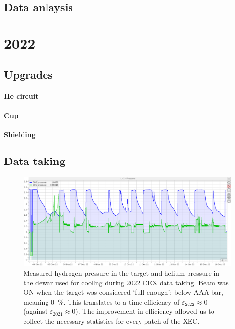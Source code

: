 \begin{refsection}
\subsection{Data anlaysis}

\section{2022}
\subsection{Upgrades}
\paragraph{He circuit}
\paragraph{Cup}
\paragraph{Shielding}
\subsection{Data taking}

\begin{figure}
    \centering
    \includegraphics[width = \textwidth]{Figures/LH2/2022CEX_LH2.png}
    \caption{Measured hydrogen pressure in the target and helium pressure in the dewar used for cooling during 2022 CEX data taking. 
    Beam was ON when the target was considered `full enough': below AAA bar, meaning \SI{0}{\%}.  
    This translates to a time efficiency of $\varepsilon_{2022}\approx0$ (against $\varepsilon_{2021}\approx0$). The improvement in efficiency allowed us to collect the necessary statistics for every patch of the XEC.}
    \label{fig:CEX2022}
\end{figure}


\end{refsection}
